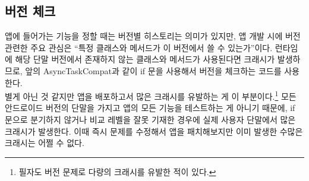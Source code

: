 \subsection{버전 체크}
앱에 들어가는 기능을 정할 때는 버전별 히스토리는 의미가 있지만, 앱 개발 시에 버전 관련한 주요 관심은 ``특정 클래스와 메서드가 이 버전에서 쓸 수 있는가''이다.
런타임에 해당 단말 버전에서 존재하지 않는 클래스와 메서드가 사용된다면 크래시가 발생하므로, 앞의 AsyncTaskCompat과 같이 if 문을 사용해서 버전을 체크하는 코드를 사용한다.\\

별게 아닌 것 같지만 앱을 배포하고서 많은 크래시를 유발하는 게 이 부분이다.\footnote{필자도 버전 문제로 다량의 크래시를 유발한 적이 있다.}
모든 안드로이드 버전의 단말을 가지고 앱의 모든 기능을 테스트하는 게 아니기 때문에, if 문으로 분기하지 않거나 비교 레벨을 잘못 기재한 경우에 실제 사용자 단말에서 많은 크래시가 발생한다. 이때 즉시 문제를 수정해서 앱을 패치해보지만 이미 발생한 수많은 크래시는 어쩔 수 없다.\\

